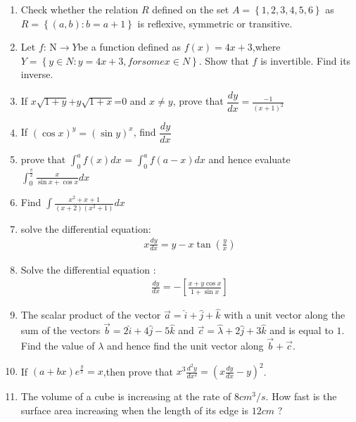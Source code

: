 \documentclass[12pt,-letter paper]{article}
\providecommand{\sbrak}[1]{\ensuremath{{}\left[#1\right]}}
\providecommand{\brak}[1]{\ensuremath{\left(#1\right)}}
\providecommand{\cbrak}[1]{\ensuremath{\left\{#1\right\}}}
\theoremstyle{remark}
\begin{document}
\begin{enumerate}
\item Check whether the relation $R$ defined on the set $A=\cbrak{1,2,3,4,5,6}$ as $R =\cbrak {(a, b) : b = a + 1}$ is reflexive, symmetric or transitive.

\item Let $f$: N$\rightarrow Y $be a function defined as $f\brak{x}= 4x + 3$,where  $Y=\cbrak{y\in N:y=4x+3,for some x\in N}$. Show that $f$ is invertible. Find its inverse.

\item If $x\sqrt{1+y}$+$y\sqrt{1+x}$=0 and $x\neq y$, prove that $\dfrac{dy}{dx} = \frac{-1}{\brak{x+1}^2}$

\item If $\brak{\cos x}^y = \brak{\sin y}^x$, find $\dfrac{dy}{dx}$

\item prove that $\int_{0}^{a} f\brak{x}dx$ = $\int_{0}^{a} f\brak{a-x}dx$ and hence evaluate $\int_{0}^{\frac{\pi}{2}}\frac{x}{{\sin x}+{\cos x}}dx$

\item Find $\int{\frac{x^2+x+1}{\brak{x+2}\brak{x^2+1}}}dx$

\item solve the differential equation: \begin{align*}{x}\frac{dy}{dx}= {y}-{x}\tan\brak{\frac{y}{x}}\end{align*}

\item Solve the differential equation : \begin{align*}\frac{dy}{dx}= -\sbrak{\frac{x+y\cos x}{1+\sin x}}\end{align*}

\item The scalar product of the vector $\overrightarrow{a} = \hat{i}+\hat{j}+\hat{k}$ with a unit vector along the sum of the vectors $\overrightarrow{b} = 2\hat{i}+4\hat{j}-5\hat{k}$ and $\overrightarrow{c} = \hat{\lambda}+2\hat{j}+3\hat{k}$ and is equal to $1$. Find the value of $\lambda$ and hence find the unit vector along $\overrightarrow{b}+\overrightarrow{c}$.

\item If $\brak{a+bx}e^\frac{y}{x}={x}$,then prove that ${x}^3\frac{d^2y}{dx^2}={\brak{x\frac{dy}{dx}-{y}}^2}$.

\item The volume of a cube is increasing at the rate of $8 cm^3/s$. How fast is the
surface area increasing when the length of its edge is $12 cm$ ?


\end{enumerate}
\end{document}
